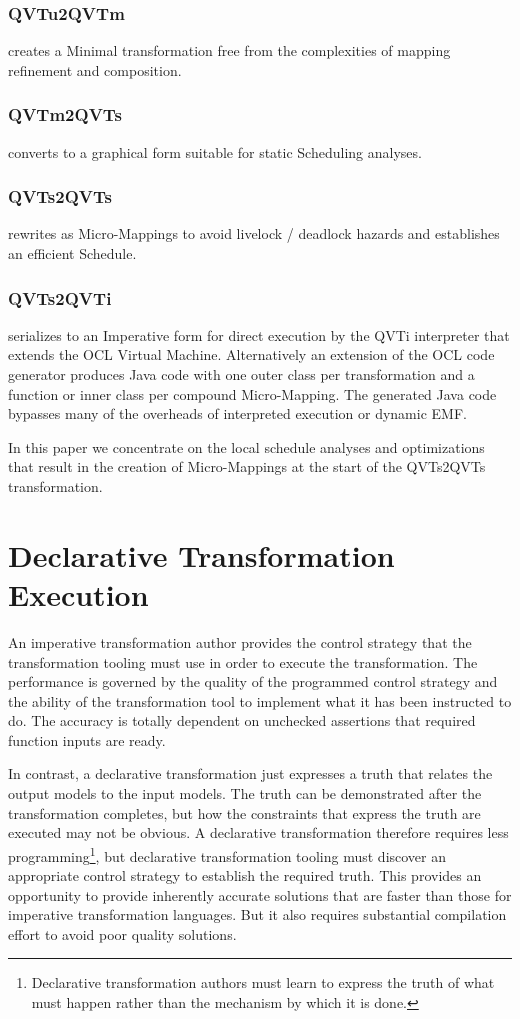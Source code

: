 \documentclass[conference]{IEEEtran}
\begin{document}
\subsubsection{QVTu2QVTm} creates a Minimal transformation free from the complexities of mapping refinement and composition.

\subsubsection{QVTm2QVTs} converts to a graphical form suitable for static Scheduling analyses.

\subsubsection{QVTs2QVTs} rewrites as Micro-Mappings to avoid livelock / deadlock hazards and establishes an efficient Schedule.

\subsubsection{QVTs2QVTi} serializes to an Imperative form for direct execution by the QVTi interpreter that extends the OCL Virtual Machine. Alternatively an extension of the OCL code generator produces Java code with one outer class per transformation and a function or inner class per compound Micro-Mapping. The generated Java code bypasses many of the overheads of interpreted execution or dynamic EMF.

In this paper we concentrate on the local schedule analyses and optimizations that result in the creation of Micro-Mappings at the start of the QVTs2QVTs transformation.

\section{Declarative Transformation Execution}\label{Declarative Transformation Execution}

An imperative transformation author provides the control strategy that the transformation tooling must use in order to execute the transformation. The performance is governed by the quality of the programmed control strategy and the ability of the transformation tool to implement what it has been instructed to do. The accuracy is totally dependent on unchecked assertions that required function inputs are ready.

In contrast, a declarative transformation just expresses a truth that relates the output models to the input models. The truth can be demonstrated after the transformation completes, but how the constraints that express the truth are executed may not be obvious. A declarative transformation therefore requires less programming\footnote{Declarative transformation authors must learn to express the truth of what must happen rather than the mechanism by which it is done.}, but declarative transformation tooling must discover an appropriate control strategy to establish the required truth. This provides an opportunity to provide inherently accurate solutions that are faster than those for imperative transformation languages. But it also requires substantial compilation effort to avoid poor quality solutions.
\end{document}

